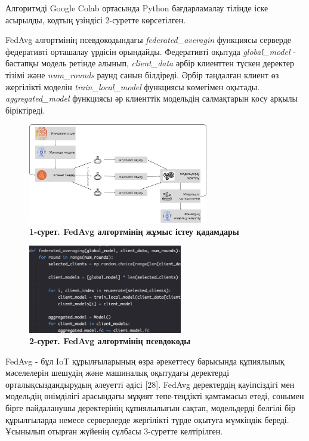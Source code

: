 \begin{multicols}{2}
Алгоритмді Google Colab ортасында Python бағдарламалау тілінде іске асырылды, кодтың үзіндісі 2-суретте көрсетілген.

FedAvg алгортмінің псевдокодындағы \emph{federated\_averagin} функциясы
серверде федеративті орташалау үрдісін орындайды. Федеративті оқытуда
\emph{global\_model} - бастапқы модель ретінде алынып,
\emph{client\_data} әрбір клиенттен түскен деректер тізімі және
\emph{num\_rounds} раунд санын білдіреді. Әрбір таңдалған клиент өз
жергілікті моделін \emph{train\_local\_model} функциясы көмегімен
оқытады. \emph{aggregated\_model} функциясы әр клиенттік модельдің
салмақтарын қосу арқылы біріктіреді.
\end{multicols}

\begin{figure}[H]
	\centering
	\includegraphics[width=0.7\textwidth]{assets/199}
	\caption*{\bfseries 1-сурет. FedAvg алгортмінің жұмыс істеу қадамдары}
\end{figure}




\begin{figure}[H]
	\centering
	\includegraphics[width=0.6\textwidth]{assets/200}
	\caption*{\bfseries 2-сурет. FedAvg алгортмінің псевдокоды}
\end{figure}


\begin{multicols}{2}


FedAvg - бұл IoT құрылғыларының өзра әрекеттесу барысында құпиялылық
мәселелерін шешудің және машиналық оқытудағы деректерді
орталықсыздандырудың әлеуетті әдісі {[}28{]}. FedAvg деректердің
қауіпсіздігі мен модельдің өнімділігі арасындағы мұқият тепе-теңдікті
қамтамасыз етеді, сонымен бірге пайдаланушы деректерінің құпиялылығын
сақтап, модельдерді белгілі бір құрылғыларда немесе серверлерде
жергілікті түрде оқытуға мүмкіндік береді. Ұсынылып отырған жүйенің
сұлбасы 3-суретте келтірілген.
\end{multicols}

